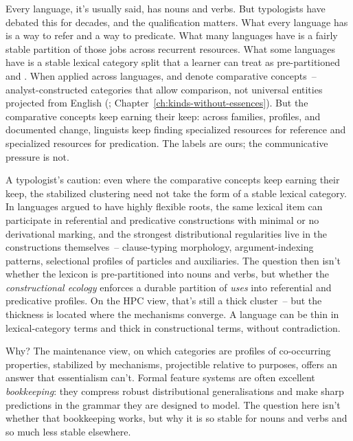 Every language, it's usually said, has nouns and verbs. But typologists have debated this for decades, and the qualification matters. What every language has is a way to refer and a way to predicate. What many languages have is a fairly stable partition of those jobs across recurrent resources. What some languages have is a stable lexical category split that a learner can treat as pre-partitioned  and . When applied across languages,  and  denote comparative concepts~-- analyst-constructed categories that allow comparison, not universal entities projected from English (\citealt{haspelmath2010}; Chapter~\ref{ch:kinds-without-essences}). But the comparative concepts keep earning their keep: across families, profiles, and documented change, linguists keep finding specialized resources for reference and specialized resources for predication. The labels are ours; the communicative pressure is not.

A typologist's caution: even where the comparative concepts keep earning their keep, the stabilized clustering need not take the form of a stable lexical category. In languages argued to have highly flexible roots, the same lexical item can participate in referential and predicative constructions with minimal or no derivational marking, and the strongest distributional regularities live in the constructions themselves~-- clause-typing morphology, argument-indexing patterns, selectional profiles of particles and auxiliaries. The question then isn't whether the lexicon is pre-partitioned into nouns and verbs, but whether the \emph{constructional ecology} enforces a durable partition of \emph{uses} into referential and predicative profiles. On the HPC view, that's still a thick cluster~-- but the thickness is located where the mechanisms converge. A language can be thin in lexical-category terms and thick in constructional terms, without contradiction.

Why? The maintenance view, on which categories are profiles of co-occurring properties, stabilized by mechanisms, projectible relative to purposes, offers an answer that essentialism can't. Formal feature systems are often excellent \emph{bookkeeping}: they compress robust distributional generalisations and make sharp predictions in the grammar they are designed to model. The question here isn't whether that bookkeeping works, but why it is so stable for nouns and verbs and so much less stable elsewhere.

